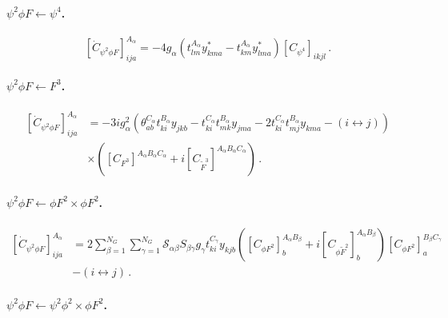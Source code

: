 \paragraph{$\psi^2 \phi F \leftarrow \psi^4$.}

\begin{equation}
    \left[\dot C_{\psi^2 \phi F}\right]_{ija}^{A_\alpha} = - 4 g_\alpha \left(
    t^{A_\alpha}_{lm} y^*_{kma} - t^{A_\alpha}_{km} y^*_{lma} 
    \right)
    \left[C_{\psi^4}\right]_{ikjl}
    \,.\label{psi2phiF_psi4}
\end{equation}

\paragraph{$\psi^2 \phi F \leftarrow F^3$.}

\begin{align}
    \left[\dot C_{\psi^2 \phi F}\right]_{ija}^{A_\alpha} &=
    - 3ig_\alpha^2 \left(
    \theta^{C_\alpha}_{ab}
    t^{B_\alpha}_{ki}y_{jkb}
    - 
    t^{C_\alpha}_{ki}t^{B_\alpha}_{mk}y_{jma} - 2 t^{C_\alpha}_{ki} t^{B_\alpha}_{mj}y_{kma}
    - \left(i \leftrightarrow j \right)
    \right)\nonumber
    \\&\times 
    \left(
    \left[C_{F^3}\right]^{A_\alpha B_\alpha C_\alpha}+i \left[C_{\widetilde F^3}\right]^{A_\alpha B_\alpha C_\alpha}
    \right)\,.
    \label{psi2phiF_F3}
\end{align}

\paragraph{$\psi^2\phi F \leftarrow \phi F^2 \times \phi F^2$.}

\begin{align}
    \left[\dot C_{\psi^2 \phi F}\right]_{ija}^{A_\alpha} &= 2 \sum_{\beta=1}^{N_G} \sum_{\gamma=1}^{N_G}\mathcal S_{\alpha\beta} S_{\beta\gamma} g_\gamma t^{C_\gamma}_{ki} y_{kjb}
    \left(
    \left[C_{\phi F^2}\right]^{A_\alpha B_\beta}_b + i \left[C_{\phi \widetilde F^2}\right]^{A_\alpha B_\beta}_b
    \right)
     \left[C_{\phi F^2}\right]^{B_\beta C_\gamma}_a 
    \nonumber \\&- (i \leftrightarrow j)\,.
    \label{psi2phiF_phiF2xphiF2}
\end{align}

\paragraph{$\psi^2\phi F \leftarrow \psi^2 \phi^2 \times \phi F^2$.}

